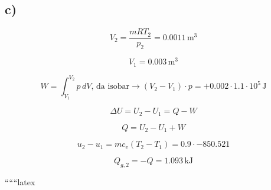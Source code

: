 

\subsection*{c)}

\[
V_2 = \frac{m R T_2}{p_2} = 0.0011 \, \text{m}^3
\]

\[
V_1 = 0.003 \, \text{m}^3
\]

\[
W = \int_{V_1}^{V_2} p \, dV, \, \text{da isobar} \rightarrow (V_2 - V_1) \cdot p = +0.002 \cdot 1.1 \cdot 10^5 \, \text{J}
\]

\[
\Delta U = U_2 - U_1 = Q - W
\]

\[
Q = U_2 - U_1 + W
\]

\[
u_2 - u_1 = m c_v (T_2 - T_1) = 0.9 \cdot -850.521
\]

\[
Q_{g,2} = -Q = 1.093 \, \text{kJ}
\]

``````latex